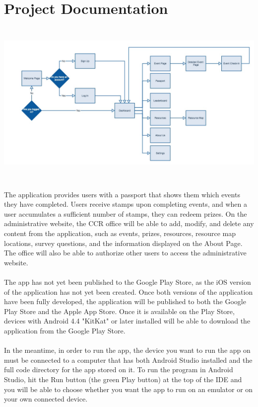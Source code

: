 \documentclass[onecolumn, draftclsnofoot,10pt, compsoc]{IEEEtran}
\begin{document}
\section{Project Documentation}
  \includegraphics[height=8cm]{appflow} \\ \\
  The application provides users with a passport that shows them which events they have completed. Users receive stamps upon completing events, and when a user accumulates a sufficient number of stamps, they can redeem prizes. On the administrative website, the CCR office will be able to add, modify, and delete any content from the application, such as events, prizes, resources, resource map locations, survey questions, and the information displayed on the About Page. The office will also be able to authorize other users to access the administrative website. \\ \\
  The app has not yet been published to the Google Play Store, as the iOS version of the application has not yet been created. Once both versions of the application have been fully developed, the application will be published to both the Google Play Store and the Apple App Store. Once it is available on the Play Store, devices with Android 4.4 "KitKat" or later installed will be able to download the application from the Google Play Store. \\ \\
  In the meantime, in order to run the app, the device you want to run the app on must be connected to a computer that has both Android Studio installed and the full code directory for the app stored on it. To run the program in Android Studio, hit the Run button (the green Play button) at the top of the IDE and you will be able to choose whether you want the app to run on an emulator or on your own connected device. \\ \\
\end{document}
